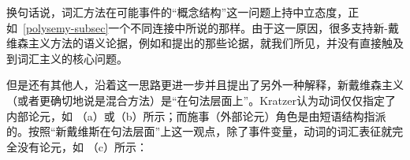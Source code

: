 \ea\label{kill-argst-two}
\z
换句话说，词汇方法在可能事件的“概念结构”这一问题上持中立态度，正如~\ref{polysemy-subsec}一个不同连接中所说的那样。由于这一原因，很多支持新-戴维森主义方法的语义论据，例如\citet[\S~4]{Schein93a-u}和\citet{Lohndal2012a}提出的那些论据，就我们所见，并没有直接触及到词汇主义的核心问题。

    但是\citet{Kratzer96a}还有其他人，沿着这一思路更进一步并且提出了另外一种解释，新戴维森主义（或者更确切地说是混合方法）是“在句法层面上”。Kratzer认为动词仅仅指定了内部论元，如 （a）或（b）所示；而施事（外部论元）角色是由短语结构指派的。按照“新戴维斯在句法层面”上这一观点，除了事件变量，动词的词汇表征就完全没有论元，如 （c）所示：

